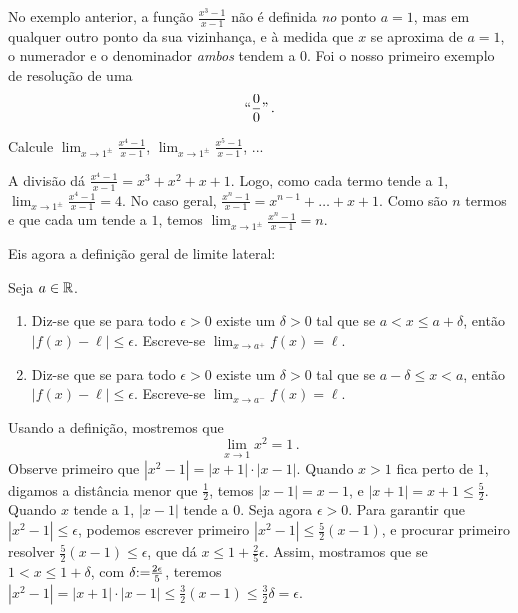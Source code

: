 \begin{obs}
No exemplo anterior, a função $\frac{x^3-1}{x-1}$ 
não é definida \emph{no} ponto $a=1$, mas 
em qualquer outro ponto da sua vizinhança, e à medida que $x$ se aproxima de $a=1$, o
numerador e o denominador \emph{ambos} tendem a $0$. 
Foi o nosso primeiro exemplo de resolução de uma 
\[``\frac{0}{0}"\,.\]
\end{obs}

\begin{exo}\label{Exo_derivpotpasencore}
Calcule $\lim_{x\to 1^{\pm}}\frac{x^4-1}{x-1}$,
$\lim_{x\to 1^{\pm}}\frac{x^5-1}{x-1}$, ...
\begin{sol}
 A divisão dá $\frac{x^4-1}{x-1}=x^3+x^2+x+1$. Logo, como cada termo tende a $1$,
$\lim_{x\to 1^{\pm}}\frac{x^4-1}{x-1}=4$.
 No caso geral, $\frac{x^n-1}{x-1}=x^{n-1}+\dots+x+1$. Como são $n$ termos e que cada um
tende a $1$, temos $\lim_{x\to 1^{\pm}}\frac{x^n-1}{x-1}=n$.
\end{sol}
\end{exo}

Eis agora a definição geral de limite lateral:

\begin{defin} Seja $a\in \mathbb{R}$. 
\begin{enumerate}
\item  Diz-se que  se
para todo $\epsilon>0$ existe um $\delta>0$
tal que se $a<x\leq a+\delta$, então $|f(x)-\ell|\leq \epsilon$.
Escreve-se $\lim_{x\to a^+}f(x)=\ell$.
\item  Diz-se que  se
para todo $\epsilon>0$ existe um $\delta>0$
tal que se $a-\delta\leq x< a$, então $|f(x)-\ell|\leq \epsilon$.
Escreve-se $\lim_{x\to a^-}f(x)=\ell$.
\end{enumerate}
\end{defin}

\begin{ex}
Usando a definição, mostremos que 
\[\lim_{x\to 1}x^2=1\,.\]
Observe primeiro que $|x^2-1|=|x+1|\cdot |x-1|$. 
Quando $x>1$ fica perto de $1$, digamos a distância menor que $\tfrac12$, temos
$|x-1|=x-1$, e $|x+1|=x+1\leq \tfrac52$. 
Quando $x$ tende a $1$, $|x-1|$ tende a
$0$. 
Seja agora $\epsilon>0$.
Para garantir que
$|x^2-1|\leq \epsilon$, podemos escrever primeiro $|x^2-1|\leq \tfrac52(x-1)$, e procurar
primeiro 
resolver $\tfrac52(x-1)\leq \epsilon$, que dá $x\leq 1+\tfrac25\epsilon$. Assim,
mostramos que se $1<x\leq 1+\delta$, com  
$\delta{:=} \frac{2\epsilon}{5}$, 
 teremos
$|x^2-1|=|x+1|\cdot |x-1|\leq \tfrac32(x-1)\leq \tfrac32\delta=\epsilon$.
\end{ex}

